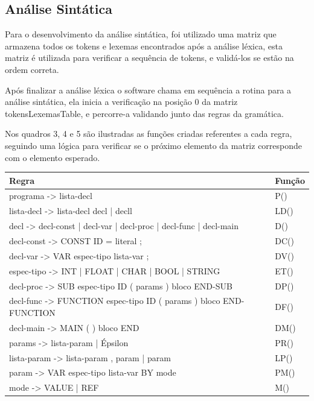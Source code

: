 \documentclass[12pt,oneside,a4paper,chapter=TITLE,section=TITLE,sumario=tradicional]{abntex2}
\begin{document}
\begin{figure}[htb]
\end{figure} 

\subsection{Análise Sintática}
\label{subsec:analisesintatica}

Para o desenvolvimento da análise sintática, foi utilizado uma matriz que armazena todos os tokens e lexemas encontrados após a análise léxica, esta matriz é utilizada para verificar a sequência de tokens, e validá-los se estão na ordem correta.  

Após finalizar a análise léxica o software chama em sequência a rotina para a análise sintática, ela inicia a verificação na posição 0 da matriz tokensLexemasTable, e percorre-a validando junto das regras da gramática.  

Nos quadros 3, 4 e 5 são ilustradas as funções criadas referentes a cada regra, seguindo uma lógica para verificar se o próximo elemento da matriz corresponde com o elemento esperado. 

\begin{quadro}[htb]
    \centering
    \vspace{0.5cm}
    \begin{tabular}[h]{|p{13.0cm}|p{2.0cm}|}
        \hline
        \textbf{Regra} & \textbf{Função} \\ 
        \hline\hline
	programa -> lista-decl  & P()   \\ \hline 
	lista-decl -> lista-decl decl | decll  & LD()   \\ \hline 
	decl -> decl-const | decl-var | decl-proc | decl-func | decl-main  & D() \\ \hline
	decl-const -> CONST ID = literal ;  & DC()   \\ \hline 
	decl-var -> VAR espec-tipo lista-var ;  & DV()   \\ \hline 
	espec-tipo -> INT | FLOAT | CHAR | BOOL | STRING  & ET()   \\ \hline 
	decl-proc -> SUB espec-tipo ID ( params ) bloco END-SUB  & DP()   \\ \hline 
	decl-func -> FUNCTION espec-tipo ID ( params ) bloco END-FUNCTION  & DF()   \\ \hline 
	decl-main -> MAIN ( ) bloco END  & DM()   \\ \hline 
	params -> lista-param | Épsilon  & PR()   \\ \hline 
	lista-param -> lista-param , param | param  & LP()   \\ \hline 
	param -> VAR espec-tipo lista-var BY mode  & PM()   \\ \hline 
	mode -> VALUE | REF  & M()   \\ \hline 
    \end{tabular}
\end{quadro}
\end{document}

